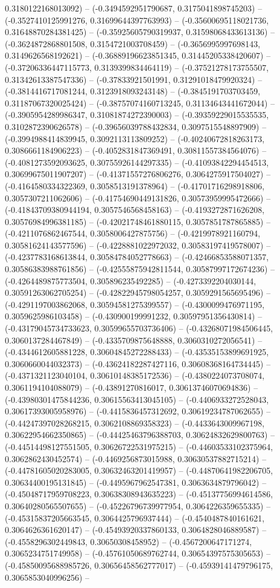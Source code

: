 0.3180122168013092) -- (-0.3494592951790687, 0.3175041898745203) -- (-0.3527410125991276, 0.31699644397763993) -- (-0.35600695118021736, 0.31648870284381425) -- (-0.35925605790319937, 0.31598068433613136) -- (-0.3624872868801508, 0.3154721003708459) -- (-0.3656995997698143, 0.3149626568192621) -- (-0.36889196623851345, 0.31445205338420607) -- (-0.37206336447115773, 0.3139399834464119) -- (-0.37521278173755507, 0.31342613387547336) -- (-0.37833921501991, 0.31291018479920324) -- (-0.3814416717081244, 0.3123918093243148) -- (-0.3845191703703459, 0.31187067320025424) -- (-0.38757074160713245, 0.31134643441672044) -- (-0.3905954289986347, 0.31081874272390003) -- (-0.39359229015535535, 0.3102872390626578) -- (-0.39656039788432834, 0.3097515548897909) -- (-0.3994988414839945, 0.3092113113809252) -- (-0.40240672818263173, 0.3086661184906223) -- (-0.4052831847369491, 0.30811557384564076) -- (-0.4081273592093625, 0.30755926144297335) -- (-0.41093842294454513, 0.30699675011907207) -- (-0.41371557276806276, 0.3064275917504027) -- (-0.4164580334322369, 0.3058513191378964) -- (-0.41701716298918806, 0.3057307211062606) -- (-0.41754690449131826, 0.30573959995472666) -- (-0.41843709380944194, 0.3057546568458163) -- (-0.4193272871626208, 0.30576984996381185) -- (-0.42021748461880115, 0.3057851787865885) -- (-0.4211076862467544, 0.3058006427875756) -- (-0.4219978921160794, 0.30581624143577596) -- (-0.4228881022972032, 0.30583197419578007) -- (-0.4237783168613844, 0.30584784052778663) -- (-0.42466853588071357, 0.30586383988761856) -- (-0.42555875942811544, 0.30587997172674236) -- (-0.4264489875773504, 0.305896235492285) -- (-0.4273392204030144, 0.30591263062705254) -- (-0.42822945798054257, 0.3059291565695496) -- (-0.4291197003862068, 0.30594581275399557) -- (-0.4300099476971195, 0.3059625986103458) -- (-0.430900199991232, 0.30597951356430814) -- (-0.43179045734733623, 0.30599655703736406) -- (-0.43268071984506445, 0.3060137284467849) -- (-0.4335709875648888, 0.3060310272056541) -- (-0.4344612605881228, 0.30604845272288433) -- (-0.43535153899691925, 0.3060660044032373) -- (-0.43624182287427116, 0.30608368164734445) -- (-0.4371321123040104, 0.30610148385172536) -- (-0.4380224073708074, 0.3061194104088079) -- (-0.43891270816017, 0.30613746070694836) -- (-0.43980301475844236, 0.30615563413045105) -- (-0.4406933272528043, 0.30617393005958976) -- (-0.4415836457312692, 0.30619234787062655) -- (-0.44247397028268215, 0.3062108869358323) -- (-0.4433643009967198, 0.30622954662350865) -- (-0.44425463796388703, 0.30624832629800763) -- (-0.44514498127551505, 0.30626722531975215) -- (-0.44603533102375964, 0.3062862430452574) -- (-0.4469256873015988, 0.30630537882715214) -- (-0.44781605020283005, 0.30632463201419957) -- (-0.44870641982206705, 0.30634400195131845) -- (-0.4495967962547381, 0.3063634879796042) -- (-0.45048717959708223, 0.30638308943635223) -- (-0.45137756994614586, 0.30640280565507655) -- (-0.45226796739977954, 0.3064226359655335) -- (-0.45315837205663545, 0.3064425796937444) -- (-0.4540487840161621, 0.3064626361620147) -- (-0.45493920337860133, 0.3064828046889587) -- (-0.4558296302449843, 0.30650308458952) -- (-0.4567200647171274, 0.3065234751749958) -- (-0.45761050689762744, 0.30654397575305653) -- (-0.45850095688985726, 0.30656458562777017) -- (-0.45939141479796175, 0.3065853040996256) -- 